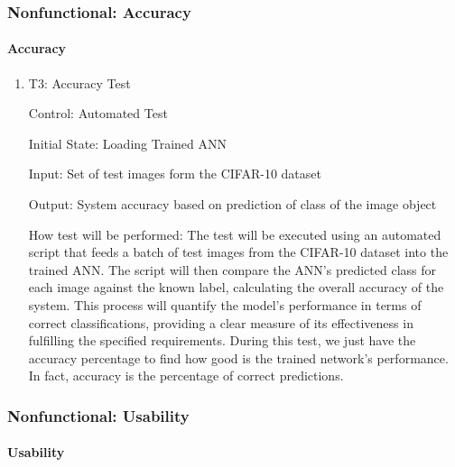 \documentclass[12pt, titlepage]{article}
\begin{document}
\subsubsection{Nonfunctional: Accuracy} \label{NFAccuracy}
		
\paragraph{Accuracy}

\begin{enumerate}

  \item{T3: Accuracy Test\\}

  Control: Automated Test
  
  Initial State: Loading Trained ANN
  
  Input: Set of test images form the CIFAR-10 dataset \citep{CIFAR10}
  
  Output: System accuracy based on prediction of class of the image object

  How test will be performed: The test will be executed using an automated 
  script that feeds a batch of test images from the CIFAR-10 dataset \citep{CIFAR10} 
  into the trained ANN. 
  The script will then compare the ANN's predicted class for each image against 
  the known label, calculating the overall accuracy of the system. This process 
  will quantify the model's performance in terms of correct classifications, 
  providing a clear measure of its effectiveness in fulfilling the specified requirements. 
  During this test, we just have the accuracy percentage to find how good is the trained network's performance. 
  In fact, accuracy is the percentage of correct predictions.

\end{enumerate}

\subsubsection{Nonfunctional: Usability} \label{NFUsability}
		
\paragraph{Usability}
\end{document}
